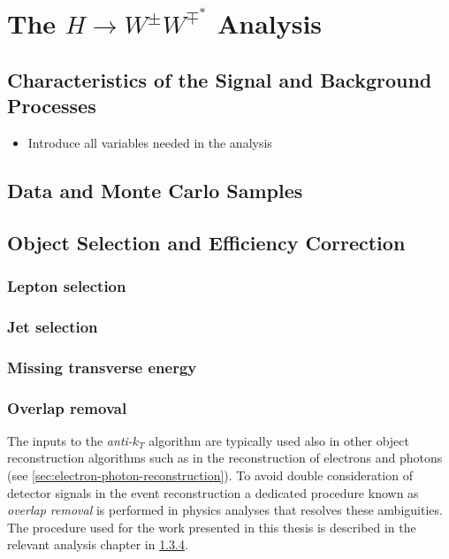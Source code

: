 \chapter{The $H\rightarrow W^{\pm}W^{\mp^*}$ Analysis}
\label{chap:hww}


\section{Characteristics of the Signal and Background Processes}
\begin{itemize}
    \item Introduce all variables needed in the analysis
\end{itemize}

\section{Data and Monte Carlo Samples}




\section{Object Selection and Efficiency Correction}
\subsection{Lepton selection}
\subsection{Jet selection}


\subsection{Missing transverse energy}
\subsection{Overlap removal}
\label{subsec:overlap-removal}

The inputs to the \emph{anti-$k_T$} algorithm are typically used also in other object reconstruction algorithms such as in the reconstruction of electrons and photons (see \cref{sec:electron-photon-reconstruction}).
To avoid double consideration of detector signals in the event reconstruction a dedicated procedure known as \emph{overlap removal} is performed in physics analyses that resolves these ambiguities. The procedure used for the work presented in this thesis is described in the relevant analysis chapter in \cref{subsec:overlap-removal}.


